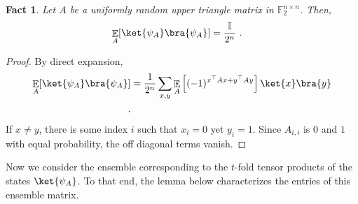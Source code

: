 \documentclass[11pt]{article}
\newtheorem{fact}[theorem]{Fact}
\newcommand{\E}{\mathop{\mathbb{E}}}
\newcommand{\id}{\ensuremath{\mathbb{I}}}
\newcommand{\F}{\mathbb{F}}
\begin{document}
\begin{fact}\label{fact:phase_1_design}
    Let $A$ be a uniformly random upper triangle matrix in $\F_2^{n \times n}$. Then,
    \begin{align}  
        \E_A[\ket{\psi_A}\bra{\psi_A}] & = \frac{\id}{2^n}\ .
    \end{align}
\end{fact}
\begin{proof}
    By direct expansion,
    \begin{align}
        \E_A[\ket{\psi_A}\bra{\psi_A}] & = \frac{1}{2^n}\sum_{x,y} \E_A\left[ (-1)^{x^\top A x + y^\top A y} \right]\ket{x}\bra{y}\\ .
    \end{align}
    If $x\neq y$, there is some index $i$ such that $x_i = 0$ yet $y_i = 1$. Since $A_{i,i}$ is $0$ and $1$ with equal probability, the off diagonal terms vanish.
\end{proof}

Now we consider the ensemble corresponding to the $t$-fold tensor products of the states $\ket{\psi_A}$. To that end, the lemma below characterizes the entries of this ensemble matrix.
\end{document}
